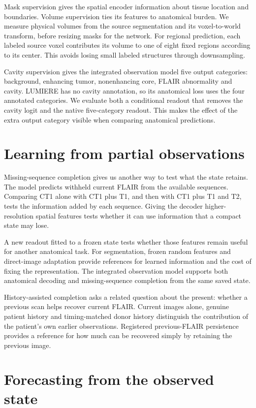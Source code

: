 Mask supervision gives the spatial encoder information about tissue location and boundaries. Volume supervision ties its features to anatomical burden. We measure physical volumes from the source segmentation and its voxel-to-world transform, before resizing masks for the network. For regional prediction, each labeled source voxel contributes its volume to one of eight fixed regions according to its center. This avoids losing small labeled structures through downsampling.

Cavity supervision gives the integrated observation model five output categories: background, enhancing tumor, nonenhancing core, FLAIR abnormality and cavity. LUMIERE has no cavity annotation, so its anatomical loss uses the four annotated categories. We evaluate both a conditional readout that removes the cavity logit and the native five-category readout. This makes the effect of the extra output category visible when comparing anatomical predictions.

\section{Learning from partial observations}

Missing-sequence completion gives us another way to test what the state retains. The model predicts withheld current FLAIR from the available sequences. Comparing CT1 alone with CT1 plus T1, and then with CT1 plus T1 and T2, tests the information added by each sequence. Giving the decoder higher-resolution spatial features tests whether it can use information that a compact state may lose.

A new readout fitted to a frozen state tests whether those features remain useful for another anatomical task. For segmentation, frozen random features and direct-image adaptation provide references for learned information and the cost of fixing the representation. The integrated observation model supports both anatomical decoding and missing-sequence completion from the same saved state.

History-assisted completion asks a related question about the present: whether a previous scan helps recover current FLAIR. Current images alone, genuine patient history and timing-matched donor history distinguish the contribution of the patient's own earlier observations. Registered previous-FLAIR persistence provides a reference for how much can be recovered simply by retaining the previous image.

\section{Forecasting from the observed state}\label{sec:cutoff}

